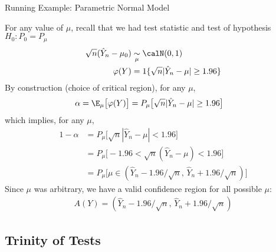 \documentclass[aspectratio=169, handout]{beamer}
\begin{document}
{\footnotesize
\begin{frame}{Running Example: Parametric Normal Model}

For any value of $\mu$, recall that we had test statistic and test
of hypothesis $H_0:P_0=P_\mu$
\begin{align*}
  \sqrt{n}(\hat{Y}_n-\mu_0)
  &\underset{\mu}{\sim}
  \calN(0,1)
  \\
  \varphi(Y)
  &=
  {1}\{
    \sqrt{n}|\hat{Y}_n-\mu|\geq 1.96
  \}
\end{align*}
By construction (choice of critical region), for any $\mu$,
\begin{align*}
  \alpha
  &=
  \E_{\mu}\big[
  \varphi(Y)
  \big]
  =
  P_{\mu}\big[
    \sqrt{n}|\hat{Y}_n-\mu|\geq 1.96
  \big]
\end{align*}
which implies, for any $\mu$,
\begin{align*}
  1-\alpha
  &=
  P_{\mu}\big[
    \sqrt{n}|\hat{Y}_n-\mu|< 1.96
  \big]
  \\
  &=
  P_{\mu}\big[
    - 1.96
    <
    \sqrt{n}(\hat{Y}_n-\mu)
    <
    1.96
  \big]
  \\
  &=
  P_{\mu}\big[
    \mu
    \in
    (
    \hat{Y}_n
    -
    1.96/\sqrt{n}
    ,\,
    \hat{Y}_n
    + 1.96/\sqrt{n}
    )
  \big]
\end{align*}
Since $\mu$ was arbitrary, we have a valid confidence region for all
possible $\mu$:
\begin{align*}
  A(Y)
  =
  (
  \hat{Y}_n
  -
  1.96/\sqrt{n}
  ,\,
  \hat{Y}_n
  + 1.96/\sqrt{n}
  )
\end{align*}

\end{frame}
}


\subsection{Trinity of Tests}
\end{document}
